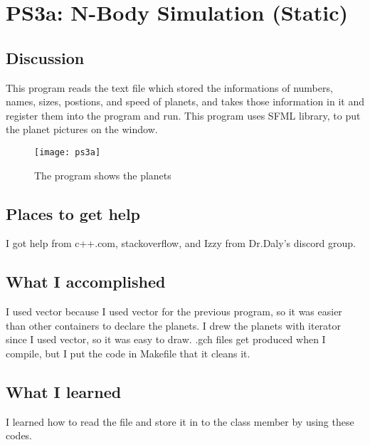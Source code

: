 \section{PS3a: N-Body Simulation (Static)}\label{sec:ps3a}

\subsection{Discussion}\label{sec:ps3a:disc}

This program reads the text file which stored the informations of numbers, names, sizes, postions, and speed of planets, and takes those information in it and register them into the program and run.
This program uses SFML library, to put the planet pictures on the window.

\begin{figure}[tbh]
	\centering
	\texttt{[image: ps3a]}
	\caption{The program shows the planets}
	\label{fig:ps3a}
\end{figure}


\subsection{Places to get help}

I got help from c++.com, stackoverflow, and Izzy from Dr.Daly's discord group.

\subsection{What I accomplished}\label{sec:ps3a:accomplish}

I used vector because I used vector for the previous program, so it was easier than other containers to declare the planets. I drew the planets with iterator since I used vector, so it was easy to draw.
.gch files get produced when I compile, but I put the code in Makefile that it cleans it. 


\subsection{What I learned}\label{sec:ps3a:learned}

I learned how to read the file and store it in to the class member by using these codes.


